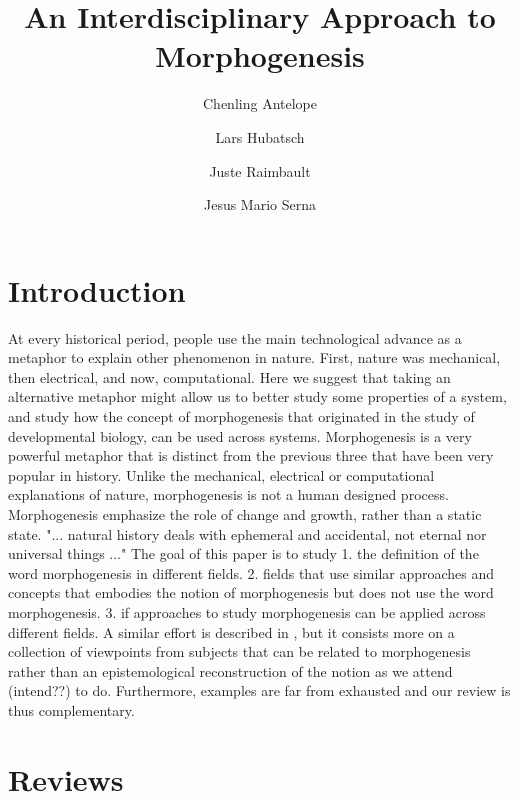 \documentclass[fleqn,10pt]{wlscirep}
\title{An Interdisciplinary Approach to Morphogenesis}
\author[1]{Chenling Antelope}
\author[2]{Lars Hubatsch}
\author[3]{Juste Raimbault}
\author[4]{Jesus Mario Serna}
\affil[1]{Affiliation, department, city, postcode, country}
\affil[2]{Affiliation, department, city, postcode, country}
\affil[*]{corresponding.author@email.example}
\affil[+]{these authors contributed equally to this work}
\begin{document}
\flushbottom
\maketitle

\thispagestyle{empty}



\section*{Introduction}

At every historical period, people use the main technological advance as a metaphor to explain other phenomenon in nature. First, nature was mechanical, then electrical, and now, computational. Here we suggest that taking an alternative metaphor might allow us to better study some properties of a system, and study how the concept of morphogenesis that originated in the study of developmental biology, can be used across systems. Morphogenesis is a very powerful metaphor that is distinct from the previous three that have been very popular in history. Unlike the mechanical, electrical or computational explanations of nature, morphogenesis is not a human designed process. Morphogenesis emphasize the role of change and growth, rather than a static state. "... natural history deals with ephemeral and accidental, not eternal nor universal things ..." \cite{thompson1942growth} The goal of this paper is to study 1. the definition of the word morphogenesis in different fields. 2. fields that use similar approaches and concepts that embodies the notion of morphogenesis but does not use the word morphogenesis. 3. if approaches to study morphogenesis can be applied across different fields. A similar effort is described in \cite{bourgine2010morphogenesis}, but it consists more on a collection of viewpoints from subjects that can be related to morphogenesis rather than an epistemological reconstruction of the notion as we attend (intend??) to do. Furthermore, examples are far from exhausted and our review is thus complementary.


\section*{Reviews}


\end{document}
